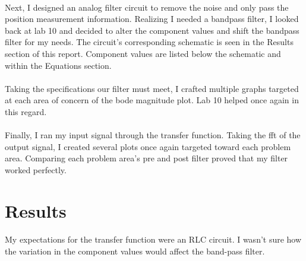 \documentclass[12pt]{report}
\begin{document}
    \paragraph{} Next, I designed an analog filter circuit to remove the noise and only pass the position measurement information. Realizing I needed a bandpass filter, I looked back at lab 10 and decided to alter the component values and shift the bandpass filter for my needs. The circuit's corresponding schematic is seen in the Results section of this report. Component values are listed below the schematic and within the Equations section. 
    
    \paragraph{}Taking the specifications our filter must meet, I crafted multiple graphs targeted at each area of concern of the bode magnitude plot. Lab 10 helped once again in this regard. 
    
    \paragraph{} Finally, I ran my input signal through the transfer function. Taking the fft of the output signal, I created several plots once again targeted toward each problem area. Comparing each problem area's pre and post filter proved that my filter worked perfectly. 
    
\section{Results}

    
    \paragraph{} My expectations for the transfer function were an RLC circuit. I wasn't sure how the variation in the component values would affect the band-pass filter.  
    
\end{document}
